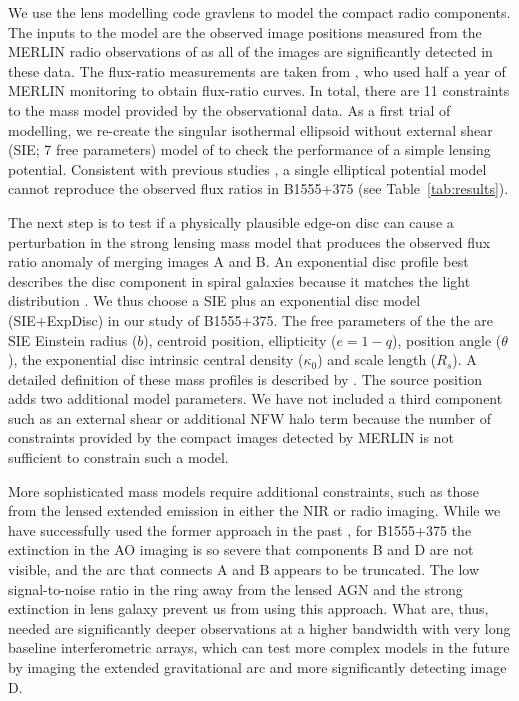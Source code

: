 \documentclass[a4paper,fleqn,usenatbib,useAMS]{mnras}
\begin{document}
We use the lens modelling code {\sc gravlens} \citep{Kee01} to model the compact radio components. The inputs to the model are the observed image positions measured from the MERLIN radio observations of \citet{Marlow99} as all of the images are significantly detected in these data. The flux-ratio measurements are taken from \citet{K03}, who used half a year of MERLIN monitoring to obtain flux-ratio curves. In total, there are 11 constraints to the mass model provided by the observational data. As a first trial of modelling, we re-create the singular isothermal ellipsoid without external shear (SIE; 7 free parameters) model of \citet{Marlow99} to check the performance of a simple lensing potential. Consistent with previous studies \citep{Marlow99,Xu15}, a single elliptical potential model cannot reproduce the observed flux ratios in B1555+375 (see Table~\ref{tab:results}). 

The next step is to test if a physically plausible edge-on disc can cause a perturbation in the strong lensing mass model that produces the observed flux ratio anomaly of  merging images A and B. An exponential disc profile best describes the disc component in spiral galaxies because it matches the light distribution \citep{Kee98}. We thus choose a SIE plus an exponential disc model (SIE+ExpDisc) in our study of B1555+375. The free parameters of the the are SIE Einstein radius ($b$), centroid position, ellipticity ($e = 1 - q$), position angle ($\theta$), the exponential disc intrinsic central density ($\kappa_0$) and scale length ($R_s$). A detailed definition of these mass profiles is described by \citet{Kee01}. The source position adds two additional model parameters. We have not included a third component such as an external shear or additional NFW halo term because the number of constraints provided by the compact images detected by MERLIN is not sufficient to constrain such a model.

More sophisticated mass models require additional
constraints, such as those from the lensed extended emission in either
the NIR or radio imaging.  While we have successfully used the former
approach in the past \citep[e.g.][]{V12}, for B1555+375 the extinction
in the AO imaging is so severe that components B and D are not
visible, and the arc that connects A and B appears to be truncated.
The low signal-to-noise ratio in the ring away from the lensed AGN and
the strong extinction in lens galaxy prevent us from using this
approach.  What are, thus, needed are significantly deeper
observations at a higher bandwidth with very long baseline
interferometric arrays, which can test more complex models in the
future by imaging the extended gravitational arc and more
significantly detecting image D. 
\end{document}
